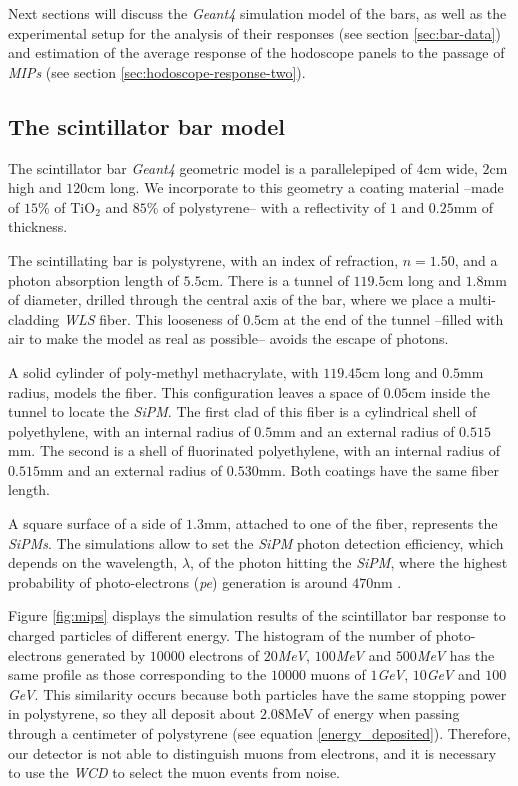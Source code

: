 \documentclass[submitting]{nst}
\begin{document}
Next sections will discuss the \textsl{Geant4} simulation model of the bars, as well as the experimental setup for the analysis of their responses (see section \ref{sec:bar-data}) and estimation of the average response of the hodoscope panels to the passage of \textsl{MIPs} (see section \ref{sec:hodoscope-response-two}). 


\subsection{The scintillator bar model} \label{sec:bar-simulation}%
The scintillator bar \textsl{Geant4} geometric model is a parallelepiped of $4$cm wide, $2$cm high and $120$cm long. We incorporate to this geometry a coating material --made of $15$\% of TiO$_2$ and $85$\% of polystyrene-- with a reflectivity of $1$ and $0.25$mm of thickness.

The scintillating bar is polystyrene, with an index of refraction, $n=1.50$, and a photon absorption length of $5.5$cm. There is a tunnel of $119.5$cm long and $1.8$mm of diameter, drilled through the central axis of the bar, where we place a multi-cladding \textsl{WLS} fiber. This looseness of $0.5$cm at the end of the tunnel --filled with air to make the model as real as possible-- avoids the escape of photons.

A solid cylinder of poly-methyl methacrylate, with $119.45$cm long and $0.5$mm radius, models the fiber. This configuration leaves a space of $0.05$cm inside the tunnel to locate the \textsl{SiPM}. The first clad of this fiber is a cylindrical shell of polyethylene, with an internal radius of $0.5$mm and an external radius of $0.515$mm. The second is a shell of fluorinated polyethylene, with an internal radius of $0.515$mm and an external radius of $0.530$mm. Both coatings have the same fiber length.

A square surface of a side of $1.3$mm, attached to one of the fiber, represents the \textsl{SiPMs}. The simulations allow to set the \textsl{SiPM} photon detection efficiency, which depends on the wavelength, $\lambda$, of the photon hitting the \textsl{SiPM}, where the highest probability of photo-electrons (\textsl{pe}) generation is around $470$nm \cite{Hamamatsu2018}.

Figure \ref{fig:mips} displays the simulation results of the scintillator bar response to charged particles of different energy. The histogram of the number of photo-electrons generated by $10000$ electrons of $20$\textsl{MeV}, $100$\textsl{MeV} and $500$\textsl{MeV} has the same profile as those corresponding to the $10000$ muons of $1$\textsl{GeV}, $10$\textsl{GeV} and $100$\textsl{GeV}. This similarity occurs because both particles have the same stopping power in polystyrene, so they all deposit about $2.08$MeV of energy when passing through a centimeter of polystyrene (see equation \ref{energy_deposited}). Therefore, our detector is not able to distinguish muons from electrons, and it is necessary to use the \textsl{WCD} to select the muon events from noise. 
\end{document}
